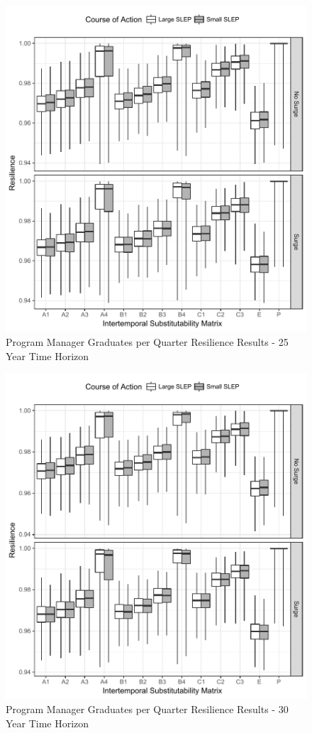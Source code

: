 \documentclass[preprint,12pt]{elsarticle}
\begin{document}
\begin{figure}[h]
  \centering\includegraphics{PMGradAllChiPlotTimeHorizon25}
  \caption{Program Manager Graduates per Quarter Resilience Results - 25 Year Time Horizon}
  \label{f:PMresultsGradAllChi25}
\end{figure}

\begin{figure}[h]
  \centering\includegraphics{PMGradAllChiPlotTimeHorizon30}
  \caption{Program Manager Graduates per Quarter Resilience Results  - 30 Year Time Horizon}
  \label{f:PMresultsGradAllChi30}
\end{figure}
\end{document}
